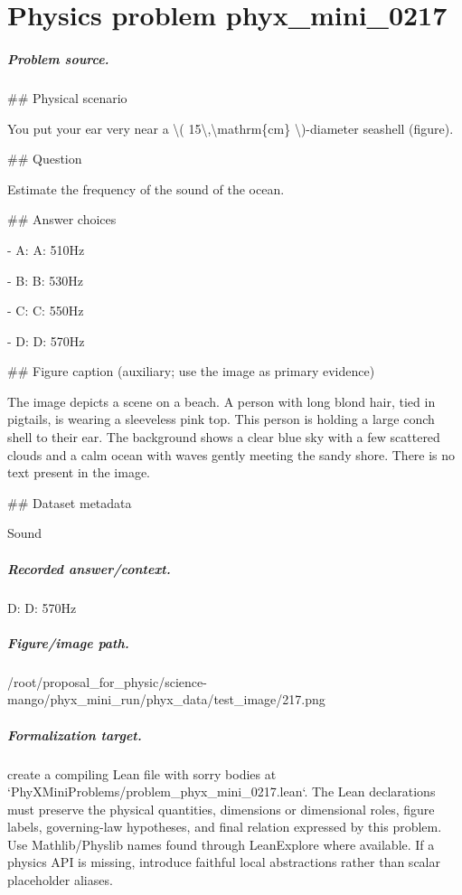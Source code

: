 
\chapter{Physics problem phyx\_mini\_0217}
\label{ch:PhyXMiniProblems_problem_phyx_mini_0217}

\paragraph{Problem source.}
\#\# Physical scenario

You put your ear very near a \textbackslash{}( 15\textbackslash{},\textbackslash{}mathrm\{cm\} \textbackslash{})-diameter seashell (figure).

\#\# Question

Estimate the frequency of the sound of the ocean.

\#\# Answer choices

- A: A: 510Hz

- B: B: 530Hz

- C: C: 550Hz

- D: D: 570Hz

\#\# Figure caption (auxiliary; use the image as primary evidence)

The image depicts a scene on a beach. A person with long blond hair, tied in pigtails, is wearing a sleeveless pink top. This person is holding a large conch shell to their ear. The background shows a clear blue sky with a few scattered clouds and a calm ocean with waves gently meeting the sandy shore. There is no text present in the image.

\#\# Dataset metadata

Sound

\paragraph{Recorded answer/context.}
D: D: 570Hz

\paragraph{Figure/image path.}
/root/proposal\_for\_physic/science-mango/phyx\_mini\_run/phyx\_data/test\_image/217.png

\paragraph{Formalization target.}
create a compiling Lean file with sorry bodies at `PhyXMiniProblems/problem\_phyx\_mini\_0217.lean`. The Lean declarations must preserve the physical quantities, dimensions or dimensional roles, figure labels, governing-law hypotheses, and final relation expressed by this problem.
Use Mathlib/Physlib names found through LeanExplore where available. If a physics API is missing, introduce faithful local abstractions rather than scalar placeholder aliases.

